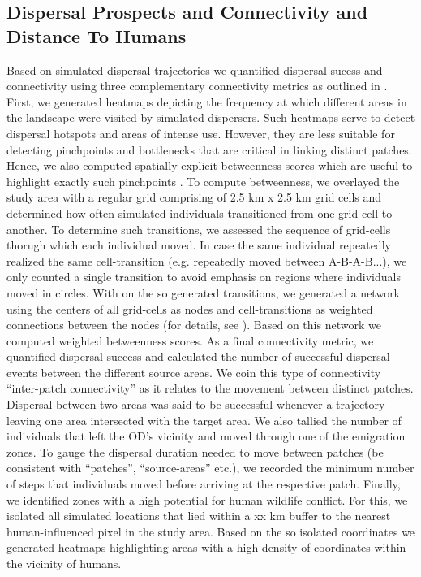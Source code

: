 \documentclass[abstract=on,10pt,a4paper,bibliography=totocnumbered]{article}
\begin{document}
\subsection{Dispersal Prospects and Connectivity and Distance To Humans}
Based on simulated dispersal trajectories we quantified dispersal sucess and
connectivity using three complementary connectivity metrics as outlined in
\cite{Hofmann.2023}. First, we generated heatmaps depicting the frequency at
which different areas in the landscape were visited by simulated dispersers.
Such heatmaps serve to detect dispersal hotspots and areas of intense use.
However, they are less suitable for detecting pinchpoints and bottlenecks that
are critical in linking distinct patches. Hence, we also computed spatially
explicit betweenness scores which are useful to highlight exactly such
pinchpoints \citep{Bastille-Rousseau.2018, Bastille-Rousseau.2021}. To compute
betweenness, we overlayed the study area with a regular grid comprising of 2.5
km x 2.5 km grid cells and determined how often simulated individuals
transitioned from one grid-cell to another. To determine such transitions, we
assessed the sequence of grid-cells thorugh which each individual moved. In case
the same individual repeatedly realized the same cell-transition (e.g.
repeatedly moved between A-B-A-B...), we only counted a single transition to
avoid emphasis on regions where individuals moved in circles. With on the so
generated transitions, we generated a network using the centers of all
grid-cells as nodes and cell-transitions as weighted connections between the
nodes (for details, see \citep{Hofmann.2023}). Based on this network we computed
weighted betweenness scores. As a final connectivity metric, we quantified
dispersal success and calculated the number of successful dispersal events
between the different source areas. We coin this type of connectivity
``inter-patch connectivity'' as it relates to the movement between distinct
patches. Dispersal between two areas was said to be successful whenever a
trajectory leaving one area intersected with the target area. We also tallied
the number of individuals that left the OD's vicinity and moved through one of
the emigration zones. To gauge the dispersal duration needed to move between
patches (be consistent with ``patches'', ``source-areas'' etc.), we recorded the
minimum number of steps that individuals moved before arriving at the respective
patch. Finally, we identified zones with a high potential for human wildlife
conflict. For this, we isolated all simulated locations that lied within a xx km
buffer to the nearest human-influenced pixel in the study area. Based on the so
isolated coordinates we generated heatmaps highlighting areas with a high
density of coordinates within the vicinity of humans.
\end{document}
